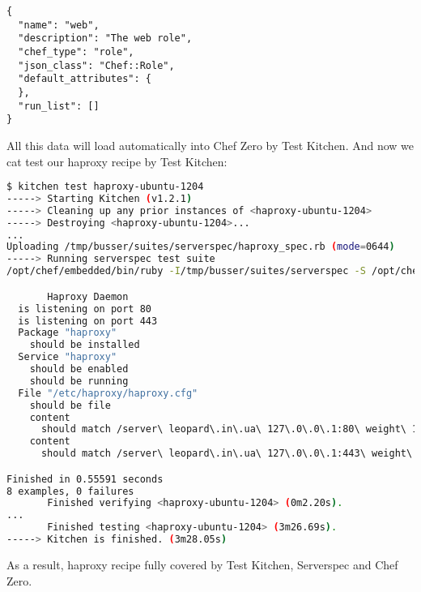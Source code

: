 \begin{lstlisting}[label=lst:testing-chef-zero22]
{
  "name": "web",
  "description": "The web role",
  "chef_type": "role",
  "json_class": "Chef::Role",
  "default_attributes": {
  },
  "run_list": []
}
\end{lstlisting}

All this data will load automatically into Chef Zero by Test Kitchen. And now we cat test our haproxy recipe by Test Kitchen:

\begin{lstlisting}[language=Bash,label=lst:testing-chef-zero23]
$ kitchen test haproxy-ubuntu-1204
-----> Starting Kitchen (v1.2.1)
-----> Cleaning up any prior instances of <haproxy-ubuntu-1204>
-----> Destroying <haproxy-ubuntu-1204>...
...
Uploading /tmp/busser/suites/serverspec/haproxy_spec.rb (mode=0644)
-----> Running serverspec test suite
/opt/chef/embedded/bin/ruby -I/tmp/busser/suites/serverspec -S /opt/chef/embedded/bin/rspec /tmp/busser/suites/serverspec/haproxy_spec.rb --color --format documentation

       Haproxy Daemon
  is listening on port 80
  is listening on port 443
  Package "haproxy"
    should be installed
  Service "haproxy"
    should be enabled
    should be running
  File "/etc/haproxy/haproxy.cfg"
    should be file
    content
      should match /server\ leopard\.in\.ua\ 127\.0\.0\.1:80\ weight\ 1\ maxconn\ 1024\ check/
    content
      should match /server\ leopard\.in\.ua\ 127\.0\.0\.1:443\ weight\ 1\ maxconn\ 1024\ check/

Finished in 0.55591 seconds
8 examples, 0 failures
       Finished verifying <haproxy-ubuntu-1204> (0m2.20s).
...
       Finished testing <haproxy-ubuntu-1204> (3m26.69s).
-----> Kitchen is finished. (3m28.05s)
\end{lstlisting}

As a result, haproxy recipe fully covered by Test Kitchen, Serverspec and Chef Zero.
